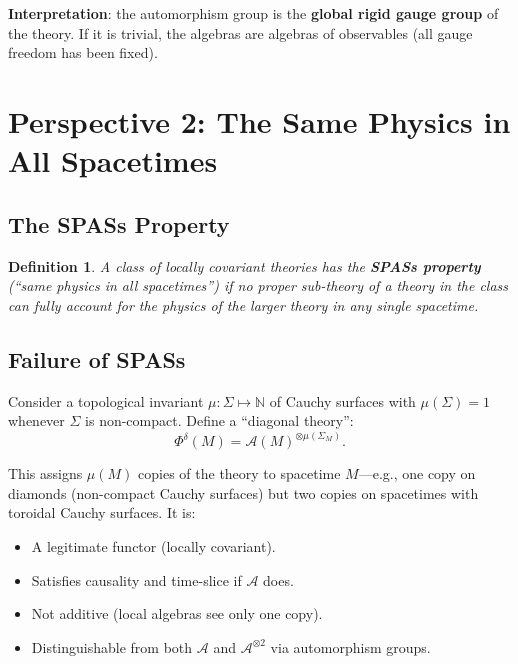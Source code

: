 \documentclass[11pt,a4paper]{article}
\newtheorem{definition}{Definition}[section]
\begin{document}
\textbf{Interpretation}: the automorphism group is the \textbf{global rigid
gauge group} of the theory. If it is trivial, the algebras are algebras of
observables (all gauge freedom has been fixed).

\section{Perspective 2: The Same Physics in All Spacetimes}

\subsection{The SPASs Property}

\begin{definition}
A class of locally covariant theories has the \textbf{SPASs property}
(``same physics in all spacetimes'') if no proper sub-theory of a theory
in the class can fully account for the physics of the larger theory in
any single spacetime.
\end{definition}

\subsection{Failure of SPASs}

Consider a topological invariant $\mu: \Sigma \mapsto \mathbb{N}$ of
Cauchy surfaces with $\mu(\Sigma) = 1$ whenever $\Sigma$ is non-compact.
Define a ``diagonal theory'':
\begin{equation}
  \Phi^\delta(M) = \mathscr{A}(M)^{\otimes \mu(\Sigma_M)}.
\end{equation}

This assigns $\mu(M)$ copies of the theory to spacetime $M$---e.g., one
copy on diamonds (non-compact Cauchy surfaces) but two copies on spacetimes
with toroidal Cauchy surfaces. It is:
\begin{itemize}[nosep]
  \item A legitimate functor (locally covariant).
  \item Satisfies causality and time-slice if $\mathscr{A}$ does.
  \item Not additive (local algebras see only one copy).
  \item Distinguishable from both $\mathscr{A}$ and $\mathscr{A}^{\otimes 2}$
        via automorphism groups.
\end{itemize}
\end{document}
